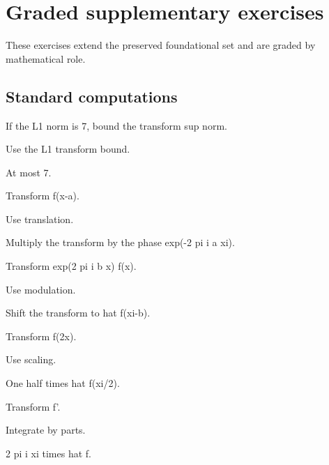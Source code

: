 \section{Graded supplementary exercises}
These exercises extend the preserved foundational set and are graded by mathematical role.

\subsection*{Standard computations}

\begin{exercise}[L1 bound]\label{exr:iii11-expand-01}
If the L1 norm is 7, bound the transform sup norm.
\end{exercise}
\begin{hint}
Use the L1 transform bound.
\end{hint}
\begin{solution}
At most 7.
\end{solution}

\begin{exercise}[Translation]\label{exr:iii11-expand-02}
Transform f(x-a).
\end{exercise}
\begin{hint}
Use translation.
\end{hint}
\begin{solution}
Multiply the transform by the phase exp(-2 pi i a xi).
\end{solution}

\begin{exercise}[Modulation]\label{exr:iii11-expand-03}
Transform exp(2 pi i b x) f(x).
\end{exercise}
\begin{hint}
Use modulation.
\end{hint}
\begin{solution}
Shift the transform to hat f(xi-b).
\end{solution}

\begin{exercise}[Scaling]\label{exr:iii11-expand-04}
Transform f(2x).
\end{exercise}
\begin{hint}
Use scaling.
\end{hint}
\begin{solution}
One half times hat f(xi/2).
\end{solution}

\begin{exercise}[Derivative]\label{exr:iii11-expand-05}
Transform f'.
\end{exercise}
\begin{hint}
Integrate by parts.
\end{hint}
\begin{solution}
2 pi i xi times hat f.
\end{solution}

